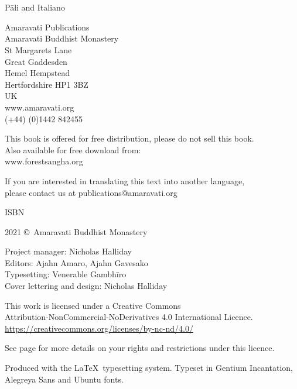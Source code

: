 
\thispagestyle{empty}

\enlargethispage{\baselineskip}

{\centering
\ifaivedition
\fontsize{12}{15}\selectfont
\else
\small
\fi
\setlength{\parskip}{15pt}

{\normalsize
\thetitle\\
\thesubtitle\\
Pāli and Italiano}

Amaravati Publications\\
Amaravati Buddhist Monastery\\
St Margarets Lane\\
Great Gaddesden\\
Hemel Hempstead\\
Hertfordshire HP1 3BZ\\
UK\\
www.amaravati.org\\
(+44) (0)1442 842455

This book is offered for free distribution, please do not sell this book.\\
Also available for free download from:\\
www.forestsangha.org

If you are interested in translating this text into another language,\\
please contact us at publications@amaravati.org

ISBN \theISBN

2021 \copyright\ Amaravati Buddhist Monastery

Project manager: Nicholas Halliday\\
Editors: Ajahn Amaro, Ajahn Gavesako\\
Typesetting: Venerable Gambhīro\\
Cover lettering and design: Nicholas Halliday

\vfill

This work is licensed under a Creative Commons\\
Attribution-NonCommercial-NoDerivatives 4.0 International Licence.\\
\href{https://creativecommons.org/licenses/by-nc-nd/4.0/}{https://creativecommons.org/licenses/by-nc-nd/4.0/}

See page\pageref{copyright-details} for more details on your rights and restrictions under this licence.

Produced with the \LaTeX\ typesetting system. Typeset in Gentium Incantation,\\
Alegreya Sans and Ubuntu fonts.

\theEditionInfo


}


